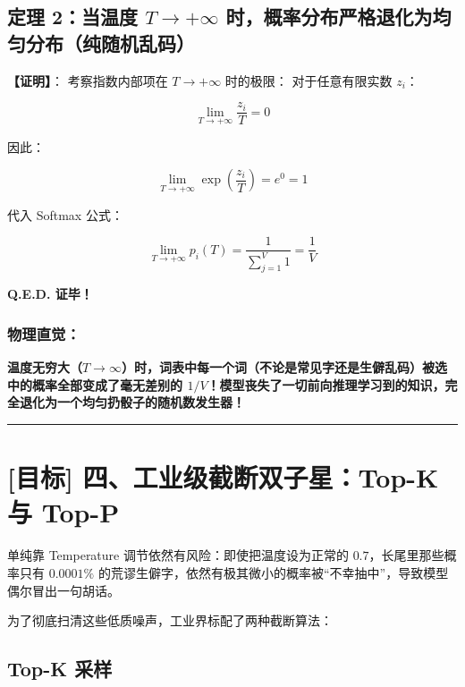 \subsection{定理 2：当温度 $T \to +\infty$ 时，概率分布严格退化为均匀分布（纯随机乱码）}

\begin{mathBox}[核心数学定理推导]
\textbf{【证明】}：
考察指数内部项在 $T \to +\infty$ 时的极限：
对于任意有限实数 $z_i$：
\end{mathBox}

\[
\lim_{T \to +\infty} \frac{z_i}{T} = 0
\]

\begin{noteBox}[核心导读与背景]
因此：
\end{noteBox}

\[
\lim_{T \to +\infty} \exp\left(\frac{z_i}{T}\right) = e^0 = 1
\]

\begin{mathBox}[核心数学定理推导]
代入 Softmax 公式：
\end{mathBox}

\[
\lim_{T \to +\infty} p_i(T) = \frac{1}{\sum_{j=1}^V 1} = \frac{1}{V}
\]

\begin{noteBox}[核心导读与背景]
\textbf{Q.E.D. 证毕！}
\end{noteBox}

\subsubsection{物理直觉：}

\textbf{温度无穷大（$T \to \infty$）时，词表中每一个词（不论是常见字还是生僻乱码）被选中的概率全部变成了毫无差别的 $1/V$！模型丧失了一切前向推理学习到的知识，完全退化为一个均匀扔骰子的随机数发生器！}

\vspace{0.8em}\hrule\vspace{0.8em}

\section{[目标] 四、工业级截断双子星：Top-K 与 Top-P}

单纯靠 Temperature 调节依然有风险：即使把温度设为正常的 $0.7$，长尾里那些概率只有 $0.0001\%$ 的荒谬生僻字，依然有极其微小的概率被“不幸抽中”，导致模型偶尔冒出一句胡话。

为了彻底扫清这些低质噪声，工业界标配了两种截断算法：

\subsection{Top-K 采样}


